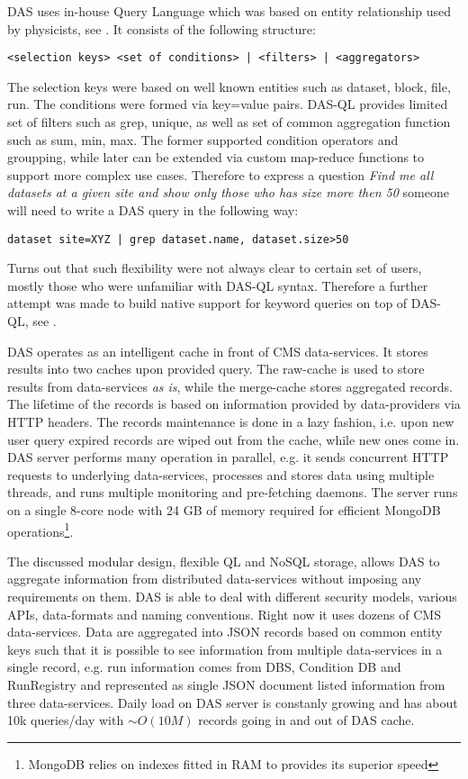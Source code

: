DAS uses in-house Query Language which was based on entity relationship used by
physicists, see \cite{DAS}. It consists of the following structure:

\begin{verbatim}
<selection keys> <set of conditions> | <filters> | <aggregators>
\end{verbatim}

The selection keys were based on well known entities such as dataset, block, file,
run. The conditions were formed via key=value pairs. DAS-QL
provides limited set of filters such as grep, unique,
as well as set of common aggregation function such as
sum, min, max. The former supported condition operators and groupping, while
later can be extended via custom map-reduce functions to support more complex
use cases. Therefore to express a question {\it Find me all datasets at a
given site and show only those who has size more then 50} someone will need to
write a DAS query in the following way:

\begin{verbatim}
dataset site=XYZ | grep dataset.name, dataset.size>50
\end{verbatim}

Turns out that such flexibility were not always clear to certain set of users,
mostly those who were unfamiliar with DAS-QL syntax. Therefore a further
attempt was made to build native support for keyword queries on top of DAS-QL,
see \cite{DASKWS}.

DAS operates as an intelligent cache in front of CMS data-services. It stores
results into two caches upon provided query. The raw-cache is used to store results from
data-services {\it as is}, while the merge-cache stores aggregated
records. The lifetime of the records is based on information provided by
data-providers via HTTP headers. The records maintenance is done in a lazy
fashion, i.e. upon new user query expired records are wiped out from the cache,
while new ones come in. DAS server performs many operation in parallel, e.g.
it sends concurrent HTTP requests to underlying data-services, processes and
stores
data using multiple threads, and runs multiple monitoring and pre-fetching
daemons. The server runs on a single 8-core node with 24 GB of memory
required for efficient MongoDB operations\footnote{MongoDB relies on indexes
fitted in RAM to provides its superior speed}.

The discussed modular design, flexible QL and NoSQL storage, allows DAS to
aggregate information from distributed data-services without imposing any
requirements on them. DAS is able to deal with different security models,
various APIs, data-formats and naming conventions. Right now it uses dozens of CMS
data-services. Data are aggregated into JSON records based on common entity
keys such that it is possible to see information from multiple
data-services in a single record, e.g. run information comes from DBS, Condition DB and
RunRegistry and represented as single JSON document listed information from
three data-services. Daily load on DAS server is constanly growing and has about 10k
queries/day with $\sim O(10M)$ records going in and out of DAS cache.
